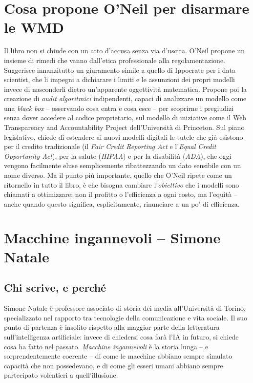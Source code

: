 \documentclass[a4paper,11pt]{article}
\begin{document}
\section{Cosa propone O'Neil per disarmare le WMD}

Il libro non si chiude con un atto d'accusa senza via d'uscita. O'Neil propone un insieme di rimedi che vanno dall'etica professionale alla regolamentazione. Suggerisce innanzitutto un giuramento simile a quello di Ippocrate per i data scientist, che li impegni a dichiarare i limiti e le assunzioni dei propri modelli invece di nasconderli dietro un'apparente oggettività matematica. Propone poi la creazione di \emph{audit algoritmici} indipendenti, capaci di analizzare un modello come una \emph{black box} -- osservando cosa entra e cosa esce -- per scoprirne i pregiudizi senza dover accedere al codice proprietario, sul modello di iniziative come il Web Transparency and Accountability Project dell'Università di Princeton. Sul piano legislativo, chiede di estendere ai nuovi modelli digitali le tutele che già esistono per il credito tradizionale (il \emph{Fair Credit Reporting Act} e l'\emph{Equal Credit Opportunity Act}), per la salute (\emph{HIPAA}) e per la disabilità (\emph{ADA}), che oggi vengono facilmente eluse semplicemente ribattezzando un dato sensibile con un nome diverso. Ma il punto più importante, quello che O'Neil ripete come un ritornello in tutto il libro, è che bisogna cambiare l'\emph{obiettivo} che i modelli sono chiamati a ottimizzare: non il profitto o l'efficienza a ogni costo, ma l'equità -- anche quando questo significa, esplicitamente, rinunciare a un po' di efficienza.

\section{Macchine ingannevoli -- Simone Natale}

\subsection{Chi scrive, e perché}

Simone Natale è professore associato di storia dei media all'Università di Torino, specializzato nel rapporto tra tecnologie della comunicazione e vita sociale. Il suo punto di partenza è insolito rispetto alla maggior parte della letteratura sull'intelligenza artificiale: invece di chiedersi cosa farà l'IA in futuro, si chiede cosa ha fatto nel passato. \emph{Macchine ingannevoli} è la storia lunga -- e sorprendentemente coerente -- di come le macchine abbiano sempre simulato capacità che non possedevano, e di come gli esseri umani abbiano sempre partecipato volentieri a quell'illusione.
\end{document}
